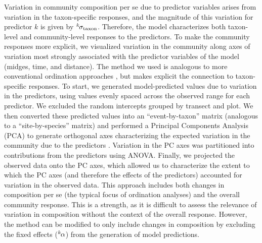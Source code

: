Variation in community composition per se due to predictor variables arises from
variation in the taxon-specific responses, and the magnitude of this variation for
predictor $k$ is given by ${}^k\hspace*{-1pt}\sigma_\text{taxon}$.
Therefore, the model characterizes both taxon-level and community-level responses
to the predictors.
To make the community responses more explicit, we visualized variation in the
community along axes of variation most strongly associated with the predictor
variables of the model (midges, time, and distance).
The method we used is analogous to more conventional ordination approaches
\citep{Mcgarigal2013}, but makes explicit the connection to taxon-specific responses.
To start, we generated model-predicted values due to variation in the predictors,
using values evenly spaced across the observed range for each predictor.
We excluded the random intercepts grouped by transect and plot.
We then converted these predicted values into an “event-by-taxon” matrix
(analogous to a “site-by-species” matrix) \citep{Mcgarigal2013} and
performed a Principal Components Analysis (PCA) to generate orthogonal axes
characterizing the expected variation in the community due to the predictors
\citep[similar to][]{Jackson2012}.
Variation in the PC axes was partitioned into contributions from the predictors using
ANOVA.
Finally, we projected the observed data onto the PC axes, which allowed us to
characterize the extent to which the PC axes (and therefore the effects of the
predictors) accounted for variation in the observed data.
This approach includes both changes in composition per se (the typical focus of
ordination analyses) and the overall community response.
This is a strength, as it is difficult to assess the relevance of variation in
composition without the context of the overall response.
However, the method can be modified to only include changes in composition by
excluding the fixed effects (${}^k\hspace*{-1pt}\alpha$) from the generation of
model predictions.








